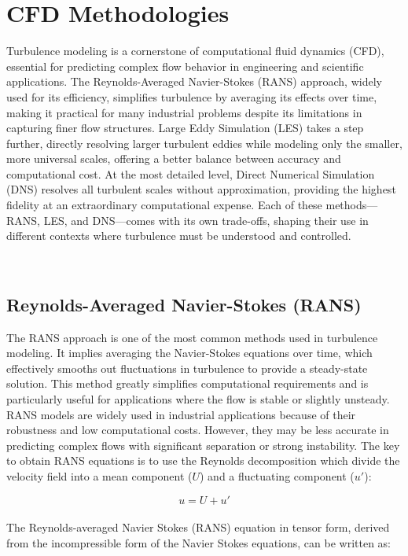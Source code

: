 \documentclass[a5paper]{sapthesis}
\begin{document}
	\section{CFD Methodologies}
	Turbulence modeling is a cornerstone of computational fluid dynamics (CFD), essential for predicting complex flow behavior in engineering and scientific applications. The Reynolds-Averaged Navier-Stokes (RANS) approach, widely used for its efficiency, simplifies turbulence by averaging its effects over time, making it practical for many industrial problems despite its limitations in capturing finer flow structures. Large Eddy Simulation (LES) takes a step further, directly resolving larger turbulent eddies while modeling only the smaller, more universal scales, offering a better balance between accuracy and computational cost. At the most detailed level, Direct Numerical Simulation (DNS) resolves all turbulent scales without approximation, providing the highest fidelity at an extraordinary computational expense. Each of these methods—RANS, LES, and DNS—comes with its own trade-offs, shaping their use in different contexts where turbulence must be understood and controlled.
	
\	\subsection{Reynolds-Averaged Navier-Stokes (RANS)}
	The RANS approach is one of the most common methods used in turbulence modeling. It implies averaging the Navier-Stokes equations over time, which effectively smooths out fluctuations in turbulence to provide a steady-state solution. This method greatly simplifies computational requirements and is particularly useful for applications where the flow is stable or slightly unsteady. RANS models are widely used in industrial applications because of their robustness and low computational costs. However, they may be less accurate in predicting complex flows with significant separation or strong instability.
	The key to obtain RANS equations is to use the Reynolds decomposition which divide the velocity field into a mean component ($U$) and a fluctuating component ($u'$):
	
	\begin{equation}
		u = U  + u'
	\end{equation}
	\\	
	The Reynolds-averaged Navier Stokes (RANS) equation in tensor form, derived from the incompressible form of the Navier Stokes equations, can be written as:
	
\end{document}
